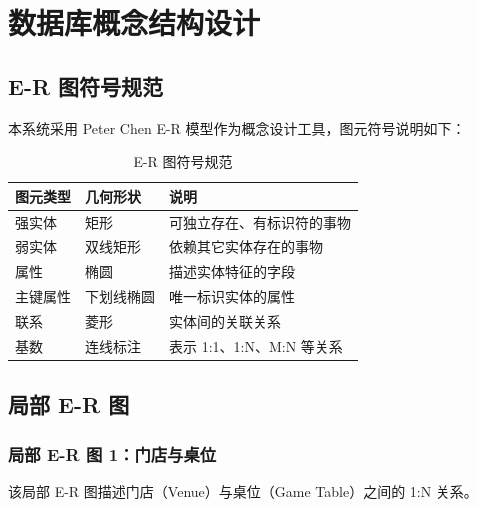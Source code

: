 \chapter{数据库概念结构设计}

\section{E-R 图符号规范}

本系统采用 Peter Chen E-R 模型作为概念设计工具，图元符号说明如下：

\begin{table}[H]
  \centering
  \caption{E-R 图符号规范}
  \label{tab:er_symbols}
  \begin{tabularx}{\textwidth}{|l|l|X|}
    \hline
    \textbf{图元类型} & \textbf{几何形状} & \textbf{说明} \\
    \hline
    强实体 & 矩形 & 可独立存在、有标识符的事物 \\
    \hline
    弱实体 & 双线矩形 & 依赖其它实体存在的事物 \\
    \hline
    属性 & 椭圆 & 描述实体特征的字段 \\
    \hline
    主键属性 & 下划线椭圆 & 唯一标识实体的属性 \\
    \hline
    联系 & 菱形 & 实体间的关联关系 \\
    \hline
    基数 & 连线标注 & 表示 1:1、1:N、M:N 等关系 \\
    \hline
  \end{tabularx}
\end{table}

\section{局部 E-R 图}

\subsection{局部 E-R 图 1：门店与桌位}

该局部 E-R 图描述门店（Venue）与桌位（Game Table）之间的 1:N 关系。

